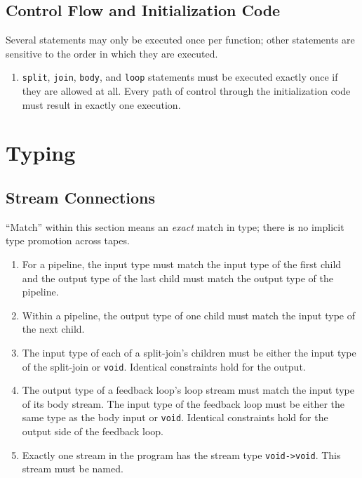\documentclass[11pt]{article}
\begin{document}
\subsection{Control Flow and Initialization Code}

Several statements may only be executed once per function; other
statements are sensitive to the order in which they are executed.

\begin{enumerate}
\item \lstinline|split|, \lstinline|join|, \lstinline|body|, and
  \lstinline|loop| statements must be executed exactly once if they
  are allowed at all.  Every path of control through the
  initialization code must result in exactly one execution.
\end{enumerate}

\section{Typing}

\subsection{Stream Connections}

``Match'' within this section means an \emph{exact} match in type;
there is no implicit type promotion across tapes.

\begin{enumerate}
\item For a pipeline, the input type must match the input type of the
  first child and the output type of the last child must match the
  output type of the pipeline.
\item Within a pipeline, the output type of one child must match the
  input type of the next child.
\item The input type of each of a split-join's children must be either
  the input type of the split-join or \lstinline|void|.  Identical
  constraints hold for the output.
\item The output type of a feedback loop's loop stream must match the
  input type of its body stream.  The input type of the feedback loop
  must be either the same type as the body input or \lstinline|void|.
  Identical constraints hold for the output side of the feedback loop.
\item Exactly one stream in the program has the stream type
  \lstinline|void->void|.  This stream must be named.
\end{enumerate}
\end{document}
